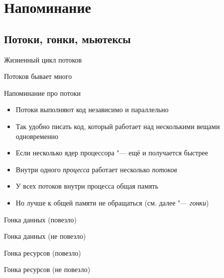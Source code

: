 \section{Напоминание}
\subsection{Потоки, гонки, мьютексы}

\begin{frame}[t,fragile]{Жизненный цикл потоков}
\end{frame}

\begin{frame}[t,fragile]{Потоков бывает много}
\end{frame}

\begin{frame}[t]{Напоминание про потоки}
	\begin{itemize}
		\item Потоки выполняют код независимо и параллельно
		\item Так удобно писать код, который работает над несколькими вещами одновременно
		\item Если несколько ядер процессора "--- ещё и получается быстрее
		\item Внутри одного \textit{процесса} работает несколько \textit{потоков}
		\item У всех потоков внутри процесса общая память
		\item Но лучше к общей памяти не обращаться (см. далее "--- \textit{гонки})
	\end{itemize}
\end{frame}

\begin{frame}[t,fragile]{Гонка данных (повезло)}
\end{frame}

\begin{frame}[t,fragile]{Гонка данных (не повезло)}
\end{frame}

\begin{frame}[t,fragile]{Гонка ресурсов (повезло)}
\end{frame}

\begin{frame}[t,fragile]{Гонка ресурсов (не повезло)}
\end{frame}

